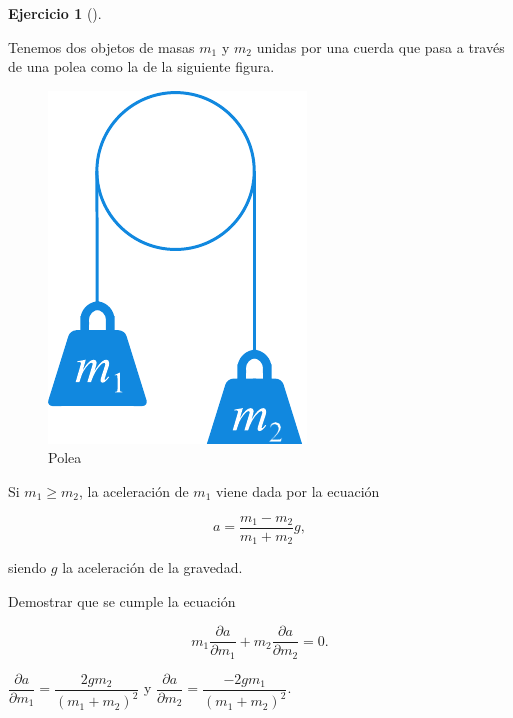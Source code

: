 \documentclass[
  a4paper,
]{scrreport}
\theoremstyle{definition}
\newtheorem{exercise}{Ejercicio}[chapter]
\theoremstyle{remark}
\begin{document}
\begin{exercise}[]\protect\hypertarget{exr-polea}{}\label{exr-polea}

Tenemos dos objetos de masas \(m_1\) y \(m_2\) unidas por una cuerda que
pasa a través de una polea como la de la siguiente figura.

\begin{figure}

{\centering \includegraphics{img/derivadas-funciones-varias-variables/polea.pdf}

}

\caption{Polea}

\end{figure}

Si \(m_1\geq m_2\), la aceleración de \(m_1\) viene dada por la ecuación

\[
a=\frac{m_1-m_2}{m_1+m_2}g,
\]

siendo \(g\) la aceleración de la gravedad.

Demostrar que se cumple la ecuación

\[
m_1\frac{\partial a}{\partial m_1}+m_2\frac{\partial a}{\partial m_2}=0.
\]

\end{exercise}

\begin{tcolorbox}[enhanced jigsaw, toprule=.15mm, bottomrule=.15mm, coltitle=black, toptitle=1mm, breakable, left=2mm, arc=.35mm, title=\textcolor{quarto-callout-tip-color}{\faLightbulb}\hspace{0.5em}{Solución}, titlerule=0mm, colback=white, colbacktitle=quarto-callout-tip-color!10!white, colframe=quarto-callout-tip-color-frame, bottomtitle=1mm, rightrule=.15mm, leftrule=.75mm, opacitybacktitle=0.6, opacityback=0]

\(\dfrac{\partial a}{\partial m_1} = \dfrac{2gm_2}{(m_1+m_2)^2}\) y
\(\dfrac{\partial a}{\partial m_2} = \dfrac{-2gm_1}{(m_1+m_2)^2}\).

\end{tcolorbox}
\end{document}
